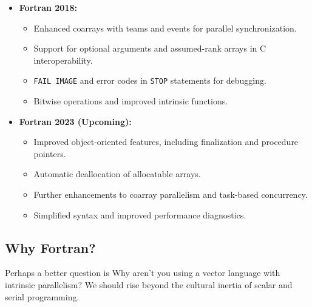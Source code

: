 \begin{itemize}
    \item \textbf{Fortran 2018:}
    \begin{itemize}
        \item Enhanced coarrays with teams and events for parallel synchronization.
        \item Support for optional arguments and assumed-rank arrays in C interoperability.
        \item \texttt{FAIL IMAGE} and error codes in \texttt{STOP} statements for debugging.
        \item Bitwise operations and improved intrinsic functions.
    \end{itemize}

    \item \textbf{Fortran 2023 (Upcoming):}
    \begin{itemize}
        \item Improved object-oriented features, including finalization and procedure pointers.
        \item Automatic deallocation of allocatable arrays.
        \item Further enhancements to coarray parallelism and task-based concurrency.
        \item Simplified syntax and improved performance diagnostics.
    \end{itemize}
\end{itemize}

\subsection{Why Fortran?}
Perhaps a better question is Why aren't you using a vector language with intrinsic parallelism? We should rise beyond the cultural inertia of scalar and serial programming.


\endinput  %